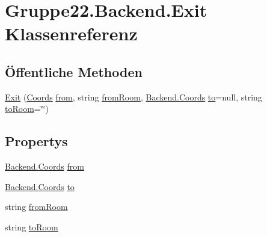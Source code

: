 \hypertarget{class_gruppe22_1_1_backend_1_1_exit}{\section{Gruppe22.\-Backend.\-Exit Klassenreferenz}
\label{class_gruppe22_1_1_backend_1_1_exit}
}
\subsection*{Öffentliche Methoden}
\begin{DoxyCompactItemize}
\item 
\hyperlink{class_gruppe22_1_1_backend_1_1_exit_a55274f1d0cdd8d6b01f1dd0187819885}{Exit} (\hyperlink{class_gruppe22_1_1_backend_1_1_coords}{Coords} \hyperlink{class_gruppe22_1_1_backend_1_1_exit_a1c66d12ccc76e3670276e5b6dff84432}{from}, string \hyperlink{class_gruppe22_1_1_backend_1_1_exit_a40c48584f9dcff97a7894b7f806fe602}{from\-Room}, \hyperlink{class_gruppe22_1_1_backend_1_1_coords}{Backend.\-Coords} \hyperlink{class_gruppe22_1_1_backend_1_1_exit_a4286116558464099383cae2dfaf75bf4}{to}=null, string \hyperlink{class_gruppe22_1_1_backend_1_1_exit_abbd47d66f499b32fa3824d1fdf14390d}{to\-Room}=\char`\"{}\char`\"{})
\end{DoxyCompactItemize}
\subsection*{Propertys}
\begin{DoxyCompactItemize}
\item 
\hyperlink{class_gruppe22_1_1_backend_1_1_coords}{Backend.\-Coords} \hyperlink{class_gruppe22_1_1_backend_1_1_exit_a1c66d12ccc76e3670276e5b6dff84432}{from}
\item 
\hyperlink{class_gruppe22_1_1_backend_1_1_coords}{Backend.\-Coords} \hyperlink{class_gruppe22_1_1_backend_1_1_exit_a4286116558464099383cae2dfaf75bf4}{to}
\item 
string \hyperlink{class_gruppe22_1_1_backend_1_1_exit_a40c48584f9dcff97a7894b7f806fe602}{from\-Room}
\item 
string \hyperlink{class_gruppe22_1_1_backend_1_1_exit_abbd47d66f499b32fa3824d1fdf14390d}{to\-Room}
\end{DoxyCompactItemize}


